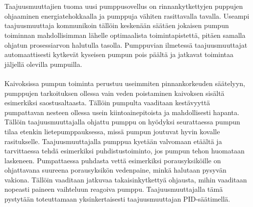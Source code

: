 \documentclass[finnish,12pt,a4paper,pdftex,elec,utf8]{aaltothesis}
\begin{document}
\\\\
Taajuusmuuttajien tuoma uusi pumppusovellus on rinnankytkettyjen puppujen ohjaaminen energiatehokkaalla ja pumppuja vähiten rasittavalla tavalla. Useampi taajuusmuuttaja kommunikoin tällöin keskenään säätäen jokaisen pumpun toiminnan mahdollisimman lähelle optimaalista toimintapistettä, pitäen samalla ohjatun prosessiarvon halutulla tasolla. Pumppuvian ilmetessä taajuusmuuttajat automaattisesti kytkevät kyseisen pumpun pois päältä ja jatkavat toimintaa jäljellä olevilla pumpuilla. \cite{ACQ810} 
\\\\
Kaivoksissa pumpun toiminta perustuu useimmiten pinnankorkeuden säätelyyn, pumppujen tarkoituksen ollessa vain veden poistaminen kaivoksen sisältä esimerkiksi saostusaltaasta. Tällöin pumpulta vaaditaan kestävyyttä pumpattavan nesteen ollessa usein kiintoainepitoista ja mahdollisesti hapanta. Tällöin taajuusmuuttajalla ohjattu pumppu on hyödyksi seurattaessa pumpun tilaa etenkin lietepumppauksessa, missä pumpun joutuvat hyvin kovalle rasitukselle. Taajuusmuuttajalla pumppua kyetään valvomaan etäältä ja tarvittaessa tehdä esimerkiksi puhdistustoiminto, jos pumpun tehon huomataan laskeneen. Pumpattaessa puhdasta vettä esimerkiksi porausyksiköille on ohjattavana suureena porausyksikön vedenpaine, minkä halutaan pysyvän vakiona. Tällöin vaaditaan jatkuvaa takaisinkytkettyä ohjausta, mihin vaaditaan nopeasti paineen vaihteluun reagoiva pumppu. Taajuusmuuttajalla tämä pystytään toteuttamaan yksinkertaisesti taajuusmuuttajan PID-säätimellä.
\end{document}

